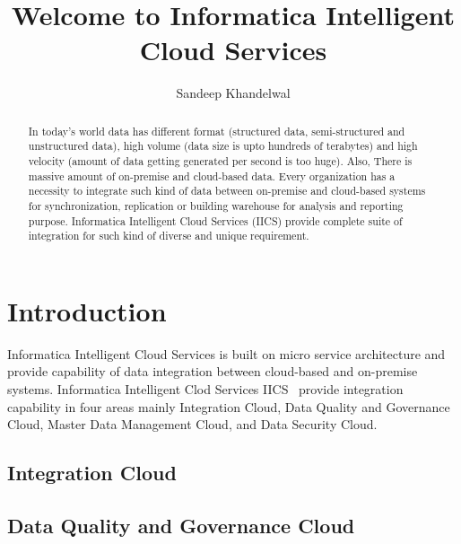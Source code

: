 \title{Welcome to Informatica Intelligent Cloud Services}

\author{Sandeep Khandelwal}

\renewcommand{\shortauthors}{S. Khandelwal}

\begin{abstract}
	
In today's world data has different format (structured data,
semi-structured and unstructured data), high volume (data size is upto
hundreds of terabytes) and high velocity (amount of data getting
generated per second is too huge). Also, There is massive amount of
on-premise and cloud-based data.  Every organization has a necessity
to integrate such kind of data between on-premise and cloud-based
systems for synchronization, replication or building warehouse for
analysis and reporting purpose. Informatica Intelligent Cloud Services
(IICS) provide complete suite of integration for such kind of diverse
and unique requirement.

\end{abstract}



\maketitle


\section{Introduction}

Informatica Intelligent Cloud Services is built on micro service
architecture and provide capability of data integration between
cloud-based and on-premise systems. Informatica Intelligent Clod
Services IICS~\cite{hid-sp18-511-iics} provide integration capability
in four areas mainly Integration Cloud, Data Quality and Governance
Cloud, Master Data Management Cloud, and Data Security Cloud.

\subsection{Integration Cloud}

\subsection{Data Quality and Governance Cloud}

